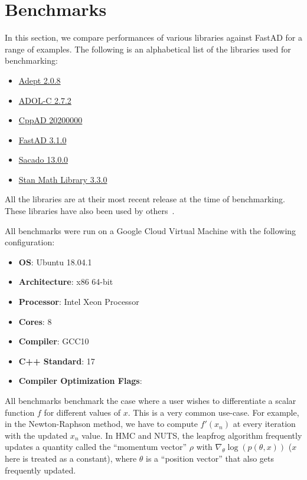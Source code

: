 \section{Benchmarks}\label{sec:benchmark}

In this section, we compare performances of 
various libraries against FastAD for a range of examples\footnotemark.
The following is an alphabetical list of the libraries used for benchmarking:\@
\begin{itemize}
    \item \href{http://www.met.reading.ac.uk/clouds/adept/}{Adept 2.0.8}~\cite{hogan:2014}
    \item \href{https://github.com/coin-or/ADOL-C}{ADOL-C 2.7.2}~\cite{griewank:1996}
    \item \href{https://coin-or.github.io/CppAD/doc/cppad.htm}{CppAD 20200000}~\cite{bell:2020}
    \item \href{https://github.com/JamesYang007/FastAD}{FastAD 3.1.0}
    \item \href{https://github.com/trilinos/Trilinos/tree/master/packages/sacado}{Sacado 13.0.0}~\cite{phipps:2009}
    \item \href{https://github.com/stan-dev/math}{Stan Math Library 3.3.0}~\cite{carpenter:2015}
\end{itemize}
All the libraries are at their most recent release at the time of benchmarking.
These libraries have also been used by others~\cite{carpenter:2015}\cite{margossian:2018}\cite{hogan:2014}.

All benchmarks were run on a Google Cloud Virtual Machine with the following configuration:
\begin{itemize}
    \item \textbf{OS}: Ubuntu 18.04.1 
    \item \textbf{Architecture}: x86 64-bit
    \item \textbf{Processor}: Intel Xeon Processor 
    \item \textbf{Cores}: 8
    \item \textbf{Compiler}: GCC10
    \item \textbf{C++ Standard}: 17
    \item \textbf{Compiler Optimization Flags}:  
\end{itemize}

All benchmarks benchmark the case where a user wishes to differentiate
a scalar function $f$ for different values of $x$.
This is a very common use-case.
For example, in the Newton-Raphson method,
we have to compute $f'(x_n)$ at every iteration with the updated $x_n$ value.
In HMC and NUTS, the leapfrog algorithm frequently
updates a quantity called the ``momentum vector'' $\rho$ 
with $\nabla_\theta \log(p(\theta, x))$ ($x$ here is treated as a constant),
where $\theta$ is a ``position vector'' that also gets frequently updated.

